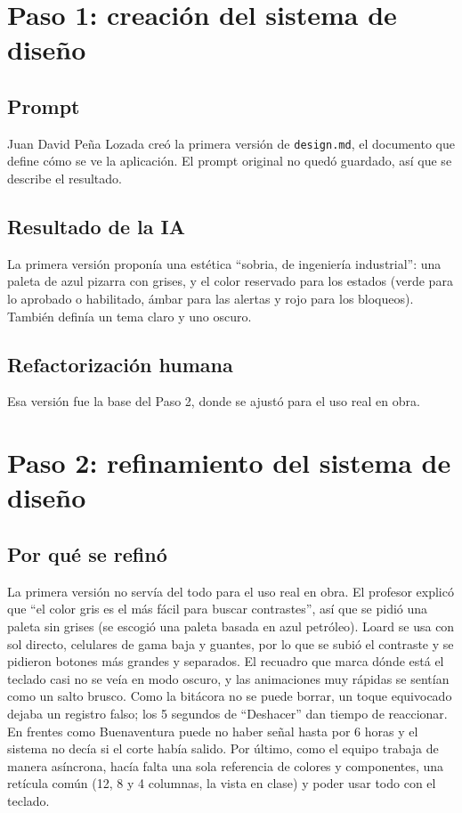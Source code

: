\documentclass[11pt]{article}
\begin{document}
\section{Paso 1: creación del sistema de diseño}\label{sec:paso1}

\subsection{Prompt}

Juan David Peña Lozada creó la primera versión de \texttt{design.md}, el documento que define cómo se ve la aplicación. El prompt original no quedó guardado, así que se describe el resultado.

\subsection{Resultado de la IA}

La primera versión proponía una estética ``sobria, de ingeniería industrial'': una paleta de azul pizarra con grises, y el color reservado para los estados (verde para lo aprobado o habilitado, ámbar para las alertas y rojo para los bloqueos). También definía un tema claro y uno oscuro.

\subsection{Refactorización humana}

Esa versión fue la base del Paso 2, donde se ajustó para el uso real en obra.

\section{Paso 2: refinamiento del sistema de diseño}\label{sec:paso2}

\subsection{Por qué se refinó}

La primera versión no servía del todo para el uso real en obra. El profesor
explicó que ``el color gris es el más fácil para buscar contrastes'', así que se
pidió una paleta sin grises (se escogió una paleta basada en azul petróleo). Loard se usa con sol directo, celulares de gama
baja y guantes, por lo que se subió el contraste y se pidieron botones más
grandes y separados. El recuadro que marca dónde está el teclado casi no se veía en modo oscuro, y las
animaciones muy rápidas se sentían como un salto brusco. Como la bitácora no se puede
borrar, un toque equivocado dejaba un registro falso; los 5 segundos de
``Deshacer'' dan tiempo de reaccionar. En frentes como Buenaventura puede no
haber señal hasta por 6 horas y el sistema no decía si el corte había salido.
Por último, como el equipo trabaja de manera asíncrona, hacía falta una sola
referencia de colores y componentes, una retícula común (12, 8 y 4
columnas, la vista en clase) y poder usar todo con el teclado.
\end{document}
